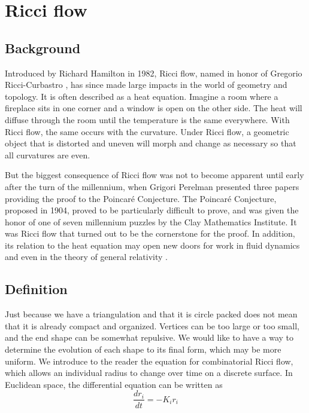 \documentclass[12pt]{article}
\begin{document}
\section{Ricci flow}
\subsection{Background}
Introduced by Richard Hamilton in 1982, Ricci flow, named in honor of Gregorio Ricci-Curbastro \cite{RicciBkgd}, has since made large impacts in the world of geometry and topology. It is often described as a heat equation. Imagine a room where a fireplace sits in one corner and a window is open on the other side. The heat will diffuse through the room until the temperature is the same everywhere. With Ricci flow, the same occurs with the curvature. Under Ricci flow, a geometric object that is distorted and uneven will morph and change as necessary so that all curvatures are even.\newline

\noindent But the biggest consequence of Ricci flow was not to become apparent until early after the turn of the millennium, when Grigori Perelman presented three papers providing the proof to the Poincar\'{e} Conjecture. The Poincar\'{e} Conjecture, proposed in 1904, proved to be particularly difficult to prove, and was given the honor of one of seven millennium puzzles by the Clay Mathematics Institute. It was Ricci flow that turned out to be the cornerstone for the proof. In addition, its relation to the heat equation may open new doors for work in fluid dynamics and even in the theory of general relativity \cite{RicciBkgd}. 

\subsection{Definition}

Just because we have a triangulation and that it is circle packed does not mean that it is already compact and organized. Vertices can be too large or too small, and the end shape can be somewhat repulsive. We would like to have a way to determine the evolution of each shape to its final form, which may be more uniform. We introduce to the reader the equation for combinatorial Ricci flow, which allows an individual radius to change over time on a discrete surface. In Euclidean space, the differential equation can be written as 
  \begin{equation}
  \label{Riccif}
  \frac{dr_i}{{dt}} = -K_ir_i
  \end{equation}
  
\end{document}
